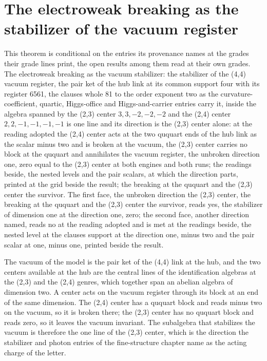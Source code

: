 \label{chend:VI-9-electroweak-table}

\section{The electroweak breaking as the stabilizer of the vacuum register}\label{mod:VI-9-D543021-vcst-t1}
\begin{chconditional}
This theorem is conditional on the entries its provenance names at the grades their grade lines print, the open results among them read at their own grades. The electroweak breaking as the vacuum stabilizer: the stabilizer of the (4,4) vacuum register, the pair ket of the hub link at its common support four with its register 6561, the clauses whole 81 to the order exponent two as the curvature-coefficient, quartic, Higgs-office and Higgs-and-carrier entries carry it, inside the algebra spanned by the (2,3) center $3,3,-2,-2,-2$ and the (2,4) center $2,2,-1,-1,-1,-1$ is one line and its direction is the (2,3) center alone: at the reading adopted the (2,4) center acts at the two ququart ends of the hub link as the scalar minus two and is broken at the vacuum, the (2,3) center carries no block at the ququart and annihilates the vacuum register, the unbroken direction one, zero equal to the (2,3) center at both engines and both runs; the readings beside, the nested levels and the pair scalars, at which the direction parts, printed at the grid beside the result; the breaking at the ququart and the (2,3) center the survivor.
The first face, the unbroken direction the (2,3) center, the breaking at the ququart and the (2,3) center the survivor, reads yes, the stabilizer of dimension one at the direction one, zero; the second face, another direction named, reads no at the reading adopted and is met at the readings beside, the nested level at the clauses support at the direction one, minus two and the pair scalar at one, minus one, printed beside the result.
\end{chconditional}
\chdeps{}{}
The vacuum of the model is the pair ket of the (4,4) link at the hub, and the two centers available at the hub are the central lines of the identification algebras at the (2,3) and the (2,4) genres, which together span an abelian algebra of dimension two. A center acts on the vacuum register through its block at an end of the same dimension. The (2,4) center has a ququart block and reads minus two on the vacuum, so it is broken there; the (2,3) center has no ququart block and reads zero, so it leaves the vacuum invariant. The subalgebra that stabilizes the vacuum is therefore the one line of the (2,3) center, which is the direction the stabilizer and photon entries of the fine-structure chapter name as the acting charge of the letter.
